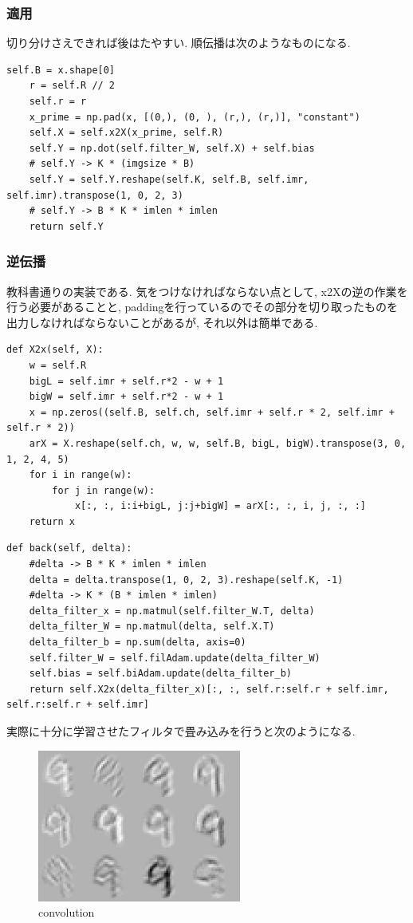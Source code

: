 \documentclass[a4paper,11pt]{jsarticle}
\begin{document}
\subsubsection*{適用}
切り分けさえできれば後はたやすい. 順伝播は次のようなものになる.
\begin{lstlisting}[caption=convolution-prop]
  self.B = x.shape[0]
    r = self.R // 2
    self.r = r
    x_prime = np.pad(x, [(0,), (0, ), (r,), (r,)], "constant")
    self.X = self.x2X(x_prime, self.R)
    self.Y = np.dot(self.filter_W, self.X) + self.bias
    # self.Y -> K * (imgsize * B)
    self.Y = self.Y.reshape(self.K, self.B, self.imr, self.imr).transpose(1, 0, 2, 3)
    # self.Y -> B * K * imlen * imlen
    return self.Y
\end{lstlisting}

\subsubsection*{逆伝播}
教科書通りの実装である.
気をつけなければならない点として, x2Xの逆の作業を行う必要があることと,
paddingを行っているのでその部分を切り取ったものを出力しなければならないことがあるが,
それ以外は簡単である.
\begin{lstlisting}[caption=X2x]
  def X2x(self, X):
    w = self.R
    bigL = self.imr + self.r*2 - w + 1
    bigW = self.imr + self.r*2 - w + 1
    x = np.zeros((self.B, self.ch, self.imr + self.r * 2, self.imr + self.r * 2))
    arX = X.reshape(self.ch, w, w, self.B, bigL, bigW).transpose(3, 0, 1, 2, 4, 5)
    for i in range(w):
        for j in range(w):
            x[:, :, i:i+bigL, j:j+bigW] = arX[:, :, i, j, :, :]
    return x
\end{lstlisting}
\begin{lstlisting}[caption=convolution-back]
  def back(self, delta):
    #delta -> B * K * imlen * imlen
    delta = delta.transpose(1, 0, 2, 3).reshape(self.K, -1)
    #delta -> K * (B * imlen * imlen)
    delta_filter_x = np.matmul(self.filter_W.T, delta)
    delta_filter_W = np.matmul(delta, self.X.T)
    delta_filter_b = np.sum(delta, axis=0)
    self.filter_W = self.filAdam.update(delta_filter_W)
    self.bias = self.biAdam.update(delta_filter_b)
    return self.X2x(delta_filter_x)[:, :, self.r:self.r + self.imr, self.r:self.r + self.imr]
\end{lstlisting}

実際に十分に学習させたフィルタで畳み込みを行うと次のようになる.
\begin{figure}[H]
  \centering
  \includegraphics[height = 5cm]{conv.jpg}
  \caption{convolution}
\end{figure}
\end{document}
